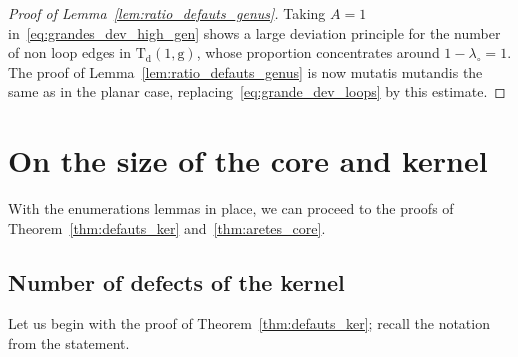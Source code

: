 \documentclass[JEP,XML,SOM,Unicode,NoFloatCountersInSection,NoEqCountersInSection]{cedram}
\theoremstyle{plain}
\theoremstyle{definition}
\theoremstyle{remark}
\newcommand{\Triv}{\mathrm{T}}
\newcommand{\defect}{\mathrm{d}}
\newcommand{\gen}{\mathrm{g}}
\begin{document}
\begin{proof}[Proof of Lemma~\ref{lem:ratio_defauts_genus}]
Taking $A = 1$ in~\eqref{eq:grandes_dev_high_gen} shows a large deviation principle for the number of non loop edges in $\Triv_{\defect}(1, \gen)$, whose proportion concentrates around $1-\lambda_\circ = 1$.
The proof of Lemma~\ref{lem:ratio_defauts_genus} is now mutatis mutandis the same as in the planar case, replacing~\eqref{eq:grande_dev_loops} by this estimate.
\end{proof}

\section{On the size of the core and kernel}
\label{sec:preuve_core_kernel}

With the enumerations lemmas in place, we can proceed to the proofs of Theorem~\ref{thm:defauts_ker} and~\ref{thm:aretes_core}.

\subsection{Number of defects of the kernel}
\label{ssec:defauts_kernel}

Let us begin with the proof of Theorem~\ref{thm:defauts_ker}; recall the notation from the statement.
\end{document}
